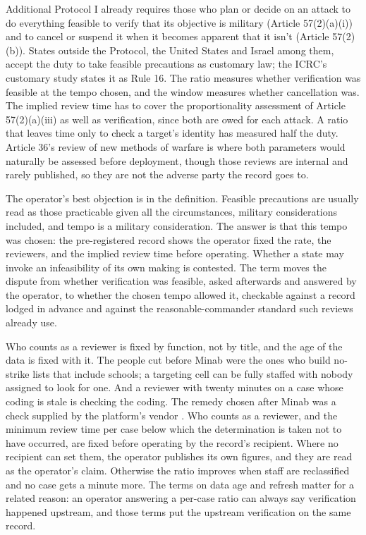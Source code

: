 Additional Protocol I already requires those who plan or decide on an attack to do everything feasible to verify that its objective is military (Article 57(2)(a)(i)) and to cancel or suspend it when it becomes apparent that it isn't (Article 57(2)(b)). States outside the Protocol, the United States and Israel among them, accept the duty to take feasible precautions as customary law; the ICRC's customary study states it as Rule 16. The ratio measures whether verification was feasible at the tempo chosen, and the window measures whether cancellation was. The implied review time has to cover the proportionality assessment of Article 57(2)(a)(iii) as well as verification, since both are owed for each attack. A ratio that leaves time only to check a target's identity has measured half the duty. Article 36's review of new methods of warfare is where both parameters would naturally be assessed before deployment, though those reviews are internal and rarely published, so they are not the adverse party the record goes to.

The operator's best objection is in the definition. Feasible precautions are usually read as those practicable given all the circumstances, military considerations included, and tempo is a military consideration. The answer is that this tempo was chosen: the pre-registered record shows the operator fixed the rate, the reviewers, and the implied review time before operating. Whether a state may invoke an infeasibility of its own making is contested. The term moves the dispute from whether verification was feasible, asked afterwards and answered by the operator, to whether the chosen tempo allowed it, checkable against a record lodged in advance and against the reasonable-commander standard such reviews already use.

Who counts as a reviewer is fixed by function, not by title, and the age of the data is fixed with it. The people cut before Minab were the ones who build no-strike lists that include schools; a targeting cell can be fully staffed with nobody assigned to look for one. And a reviewer with twenty minutes on a case whose coding is stale is checking the coding. The remedy chosen after Minab was a check supplied by the platform's vendor \autocite{Bloomberg2026KillChain}. Who counts as a reviewer, and the minimum review time per case below which the determination is taken not to have occurred, are fixed before operating by the record's recipient. Where no recipient can set them, the operator publishes its own figures, and they are read as the operator's claim. Otherwise the ratio improves when staff are reclassified and no case gets a minute more. The terms on data age and refresh matter for a related reason: an operator answering a per-case ratio can always say verification happened upstream, and those terms put the upstream verification on the same record.


